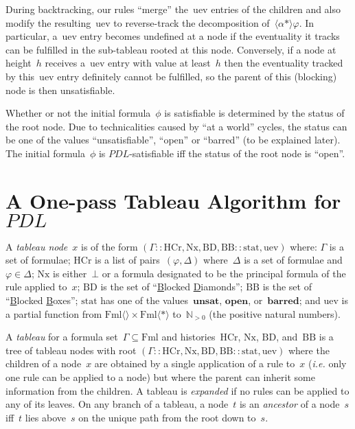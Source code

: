 \documentclass{entcs}
\newcommand{\ie}{\emph{i.e.}}
\newcommand{\Natp}{{\mathbb N_{>0}}}
\newcommand{\pea}[2]{\langle#1\rangle #2}
\newcommand{\prp}[1]{#1*}
\newcommand{\pdl}{$PDL$}
\newcommand{\fml}{\mathrm{Fml}}
\newcommand{\fmlea}{\mathrm{Fml}\pea{}{}}
\newcommand{\fmler}{\mathrm{Fml}\pea{\prp{}}{}}
\newcommand{\tnode}[3]{(#1 :: #2 :: #3)}
\newcommand{\thc}{\mathrm{HCr}}
\newcommand{\tnext}{\mathrm{Nx}}
\newcommand{\tbdia}{\mathrm{BD}}
\newcommand{\tbbox}{\mathrm{BB}}
\newcommand{\tmrk}{\mathrm{stat}}
\newcommand{\tuev}{\mathrm{uev}}
\newcommand{\ttrue}{\mathbf{unsat}}
\newcommand{\tloop}{\mathbf{barred}}
\newcommand{\tfalse}{\mathbf{open}}
\begin{document}
During backtracking, our rules ``merge'' the~$\tuev$ entries of the children
and also modify the resulting~$\tuev$
to reverse-track the decomposition of~$\pea{\prp{\alpha}}{\varphi}$.
In particular, a~$\tuev$ entry becomes undefined at a node
if the eventuality it tracks can be fulfilled in the sub-tableau rooted at this node.
Conversely, if a node at height~$h$ receives a~$\tuev$ entry with value at least~$h$
then the eventuality tracked by this~$\tuev$ entry definitely cannot be fulfilled,
so the parent of this (blocking) node is then unsatisfiable.

Whether or not the initial formula~$\phi$ is satisfiable
is determined by the status of the root node.
Due to technicalities caused by ``at a world'' cycles,
the status can be one of the values ``unsatisfiable'', ``open'' or ``barred'' (to be explained later).
The initial formula~$\phi$ is \pdl{}-satisfiable iff the status of the root node is ``open''.


\section{A One-pass Tableau Algorithm for \pdl{}}

\begin{definition}
  A \emph{tableau node}~$x$ is of the form $\tnode{\Gamma}{\thc, \tnext, \tbdia, \tbbox}{\tmrk, \tuev}$ where:
  $\Gamma$ is a set of formulae;
  $\thc$ is a list of pairs~$(\varphi, \Delta)$ where~$\Delta$ is a set of formulae and~$\varphi \in \Delta$;
  $\tnext$ is either~$\bot$ or a formula designated to be the principal formula of the rule applied to~$x$;
  $\tbdia$ is the set of ``\underline{B}locked \underline{D}iamonds'';
  $\tbbox$ is the set of ``\underline{B}locked \underline{B}oxes'';
  $\tmrk$ has one of the values~$\ttrue$, $\tfalse$, or~$\tloop$; and
  $\tuev$ is a partial function from $\fmlea \!\times \fmler$
  to~$\Natp$ (the positive natural numbers).
\end{definition}

\begin{definition}
  A \emph{tableau} for a formula set~$\Gamma \subseteq \fml$ and histories~$\thc$, $\tnext$, $\tbdia$, and~$\tbbox$
  is a tree of tableau nodes with root $\tnode{\Gamma}{\thc, \tnext, \tbdia, \tbbox}{\tmrk, \tuev}$
  where the children of a node~$x$ are obtained by a single application of a rule to~$x$
  (\ie{} only one rule can be applied to a node)
  but where the parent can inherit some information from the children.
  A tableau is \emph{expanded} if no rules can be applied to any of its leaves.
  On any branch of a tableau, a node~$t$ is an \emph{ancestor} of a node~$s$
  iff~$t$ lies above~$s$ on the unique path from the root down to~$s$.
\end{definition}
\end{document}
